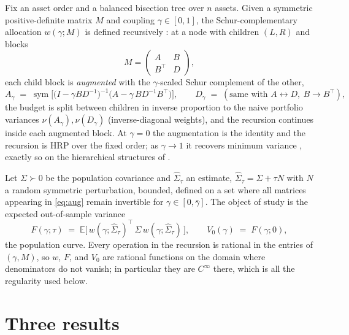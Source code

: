 \documentclass[11pt]{article}
\newcommand{\E}{\mathbb{E}}
\begin{document}
Fix an asset order and a balanced bisection tree over $n$ assets. Given a
symmetric positive-definite matrix $M$ and coupling $\gamma \in [0,1]$, the
Schur-complementary allocation $w(\gamma; M)$ is defined recursively
\parencite{cotton2024schur}: at a node with children $(L, R)$ and blocks
\[
  M = \begin{pmatrix} A & B \\ B^\top & D \end{pmatrix},
\]
each child block is \emph{augmented} with the $\gamma$-scaled Schur complement
of the other,
\begin{equation}
  A_\gamma \;=\; \operatorname{sym}\!\Big[\big(I - \gamma B D^{-1}\big)^{-1}
  \big(A - \gamma\, B D^{-1} B^\top\big)\Big],
  \qquad
  D_\gamma \;=\; (\text{same with } A \leftrightarrow D,\ B \to B^\top),
  \label{eq:aug}
\end{equation}
the budget is split between children in inverse proportion to the naive
portfolio variances $\nu(A_\gamma), \nu(D_\gamma)$ (inverse-diagonal weights),
and the recursion continues inside each augmented block. At $\gamma = 0$ the
augmentation is the identity and the recursion is HRP over the fixed order; as
$\gamma \to 1$ it recovers minimum variance
\parencite{cotton2024schur,lopezdeprado2016}, exactly so on the hierarchical
structures of \textcite{mograby2025}.

Let $\Sigma \succ 0$ be the population covariance and $\widehat\Sigma_\tau$ an
estimate, $\widehat\Sigma_\tau = \Sigma + \tau N$ with $N$ a random symmetric
perturbation, bounded, defined on a set where all matrices appearing in
\eqref{eq:aug} remain invertible for $\gamma \in [0, \bar\gamma]$. The object
of study is the expected out-of-sample variance
\begin{equation}
  F(\gamma; \tau) \;=\; \E\big[\, w(\gamma; \widehat\Sigma_\tau)^\top\, \Sigma\,
  w(\gamma; \widehat\Sigma_\tau) \,\big],
  \qquad
  V_0(\gamma) \;=\; F(\gamma; 0),
  \label{eq:F}
\end{equation}
the population curve. Every operation in the recursion is rational in the
entries of $(\gamma, M)$, so $w$, $F$, and $V_0$ are rational functions on the
domain where denominators do not vanish; in particular they are $C^\infty$
there, which is all the regularity used below.

\section{Three results}
\end{document}
